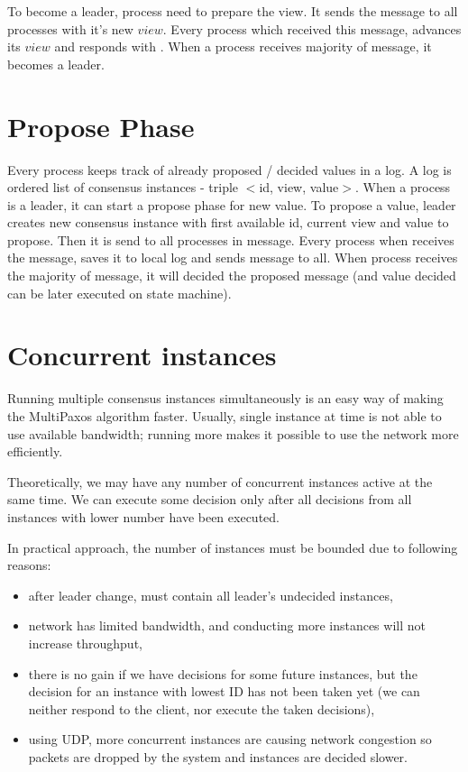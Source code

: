 To become a leader, process need to prepare the view. It sends the \prepare message to all processes with it's new $view$. Every process which received this message, advances its $view$ and responds with \prepareOK. When a process receives majority of \prepareOK message, it becomes a leader.

\section{Propose Phase}

Every process keeps track of already proposed / decided values in a log. A log is ordered list of consensus instances - triple $<$id, view, value$>$. When a process is a leader, it can start a propose phase for new value. To propose a value, leader creates new consensus instance with first available id, current view and value to propose. Then it is send to all processes in \propose message. Every process when receives the \propose message, saves it to local log and sends \accept message to all. When process receives the majority of \accept message, it will decided the proposed message (and value decided can be later executed on state machine). 

\section{Concurrent instances}
\label{subsec:concurrent_instances}
Running multiple consensus instances simultaneously is an easy way of making the MultiPaxos algorithm faster. Usually, single instance at time is not able to use available bandwidth; running more makes it possible to use the network more efficiently.

Theoretically, we may have any number of concurrent instances active at the same time. We can execute some decision only after all decisions from all instances with lower number have been executed.

In practical approach, the number of instances must be bounded due to following reasons:
\begin{itemize} 
  \item after leader change, \prepareOK must contain all leader's undecided instances,
  \item network has limited bandwidth, and conducting more instances will not increase throughput,
  \item there is no gain if we have decisions for some future instances, but the decision for an instance with lowest ID has not been taken yet (we can neither respond to the client, nor execute the taken decisions),
  \item using UDP, more concurrent instances are causing network congestion so packets are dropped by the system and instances are decided slower.
\end{itemize}


